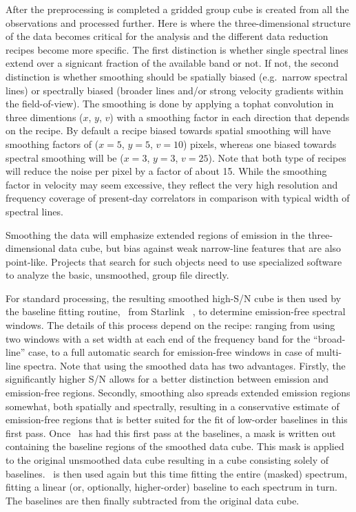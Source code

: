 \documentclass[final,authoryear,5p,times,twocolumn]{elsarticle}
\begin{document}
After the preprocessing is completed a gridded group cube is created
from all the observations and processed further. Here is where the
three-dimensional structure of the data becomes critical for the analysis
and the different data reduction recipes become more specific. The first
distinction is whether single spectral lines extend over a signicant
fraction of the available band or not. If not, the second distinction
is whether smoothing should be spatially biased (e.g.\ narrow spectral
lines) or spectrally biased (broader lines and/or strong velocity
gradients within the field-of-view). The smoothing is done by applying
a tophat convolution in three dimentions ($x$, $y$, $v$) with a smoothing
factor in each direction that depends on the recipe.  By default a
recipe biased towards spatial smoothing will have smoothing factors of
($x=5$, $y=5$, $v=10$) pixels, whereas one biased towards spectral smoothing
will be ($x=3$, $y=3$, $v=25$). Note that both type of recipes will reduce
the noise per pixel by a factor of about 15. While the smoothing
factor in velocity may seem excessive, they reflect the very high
resolution and frequency coverage of present-day correlators in
comparison with typical width of spectral lines.

Smoothing the data will emphasize extended regions of emission in the
three-dimensional data cube, but bias against weak narrow-line features that are also
point-like. Projects that search for such objects need to use specialized
software to analyze the basic, unsmoothed, group file directly.

For standard processing, the resulting smoothed high-S/N cube
is then used by the baseline  fitting routine, \mfittrend\ from
Starlink \KAPPA\ \citep[][, see \S\ref{sec:mfittrend}]{SUN95,2008ASPC..394..650C}, to determine
emission-free spectral windows.
The details of this process depend on the recipe: ranging from using two
windows with a set width at each end of the frequency band
for the ``broad-line'' case,  to a full automatic search for emission-free
windows in case of multi-line spectra. Note that using the smoothed data has
two advantages. Firstly, the significantly higher S/N  allows for a better
distinction between emission and emission-free regions. Secondly, smoothing
also spreads extended emission regions somewhat, both spatially and spectrally,
resulting in a conservative estimate of emission-free regions that is better suited for
the fit of low-order baselines in this first  pass. Once \mfittrend\ has
had this first pass at the baselines,  a mask is written out containing the
baseline  regions of the smoothed data cube. This mask is applied to the original
unsmoothed data cube resulting in a cube consisting solely of
baselines. \mfittrend\ is then used again but this time fitting
the entire (masked) spectrum, fitting a linear (or, optionally, higher-order) baseline
to each spectrum in turn. The baselines are then finally subtracted from the
original data cube.
\end{document}
